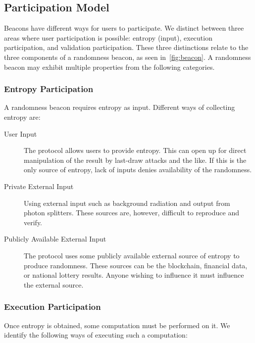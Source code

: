 \subsection{Participation Model}
\label{sub:participation_model}
Beacons have different ways for users to participate. We distinct between three areas where user participation is possible: entropy (input), execution participation, and validation participation. These three distinctions relate to the three components of a randomness beacon, as seen in~\vref{fig:beacon}. A randomness beacon may exhibit multiple properties from the following categories.

\subsubsection{Entropy Participation}
A randomness beacon requires entropy as input. Different ways of collecting entropy are:

\begin{description}
    \item [User Input] The protocol allows users to provide entropy. This can open up for direct manipulation of the result by last-draw attacks and the like. If this is the only source of entropy, lack of inputs denies availability of the randomness.
    \item [Private External Input] Using external input such as background radiation and output from photon splitters. These sources are, however, difficult to reproduce and verify.
    \item [Publicly Available External Input] The protocol uses some publicly available external source of entropy to produce randomness. These sources can be the blockchain, financial data, or national lottery results. Anyone wishing to influence it must influence the external source.
\end{description}

\subsubsection{Execution Participation}
Once entropy is obtained, some computation must be performed on it. We identify the following ways of executing such a computation:


